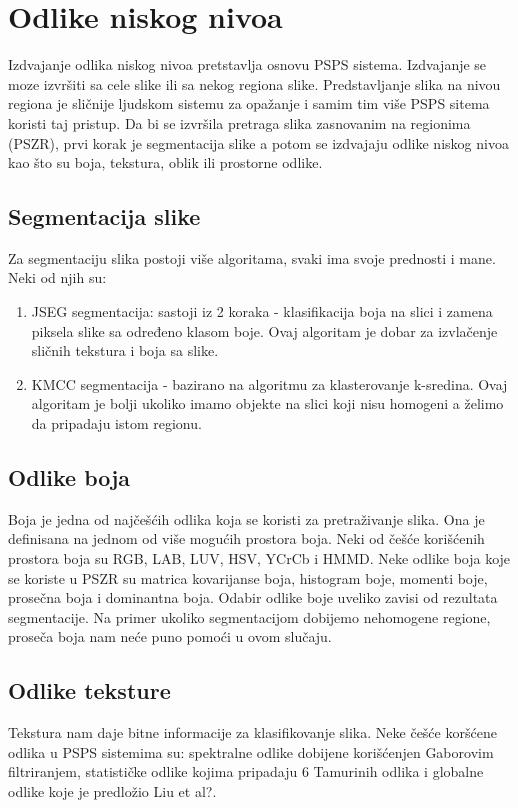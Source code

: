 \documentclass{article}
\begin{document}
\section{Odlike niskog nivoa}
Izdvajanje odlika niskog nivoa pretstavlja osnovu PSPS sistema. Izdvajanje se moze izvršiti sa cele slike ili sa nekog regiona slike. Predstavljanje slika na nivou regiona je sličnije ljudskom sistemu za opažanje i samim tim više PSPS sitema koristi taj pristup. Da bi se izvršila pretraga slika zasnovanim na regionima (PSZR), prvi korak je segmentacija slike a potom se izdvajaju odlike niskog nivoa kao što su boja, tekstura, oblik ili prostorne odlike.

\subsection{Segmentacija slike}
Za segmentaciju slika postoji više algoritama, svaki ima svoje prednosti i mane. Neki od njih su:
\begin{enumerate}
\item JSEG segmentacija: sastoji iz 2 koraka - klasifikacija boja na slici i zamena piksela slike sa određeno klasom boje. Ovaj algoritam je dobar za izvlačenje sličnih tekstura i boja sa slike.
\item KMCC segmentacija - bazirano na algoritmu za klasterovanje k-sredina. Ovaj algoritam je bolji ukoliko imamo objekte na slici koji nisu homogeni a želimo da pripadaju istom regionu.
\end{enumerate}

\subsection{Odlike boja}
Boja je jedna od najčešćih odlika koja se koristi za pretraživanje slika. Ona je definisana na jednom od više mogućih prostora boja. Neki od češće korišćenih prostora boja su RGB, LAB, LUV, HSV, YCrCb i HMMD. Neke odlike boja koje se koriste u PSZR su matrica kovarijanse boja, histogram boje, momenti boje, prosečna boja i dominantna boja. Odabir odlike boje uveliko zavisi od rezultata segmentacije. Na primer ukoliko segmentacijom dobijemo nehomogene regione, proseča boja nam neće puno pomoći u ovom slučaju.

\subsection{Odlike teksture}
Tekstura nam daje bitne informacije za klasifikovanje slika. Neke češće koršćene odlika u PSPS sistemima su: spektralne odlike dobijene korišćenjen Gaborovim filtriranjem, statističke odlike kojima pripadaju 6 Tamurinih odlika i globalne odlike koje je predložio Liu et al?.
\end{document}
